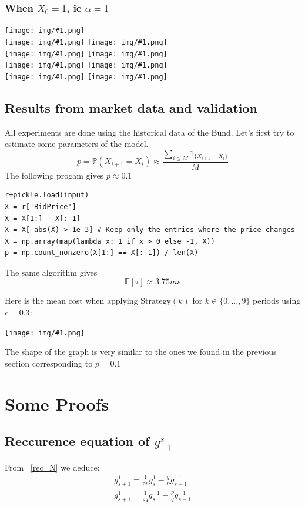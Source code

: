\documentclass{article}
\newcommand{\g}[2]{g_{#1}^{#2}}
\newcommand{\IMG}[1] { \texttt{[image: img/\#1.png]} }
\begin{document}
\newpage

\subsubsection*{When $X_0 = 1$, ie $\alpha=1$}

\IMG{11} \\
\IMG{12}
\IMG{13} \\
\IMG{14}
\IMG{15} \\
\IMG{16}
\IMG{17} \\
\IMG{18}
\IMG{19} \\

\newpage

\subsection{Results from market data and validation}
All experiments are done using the historical data of the Bund. Let's first try to estimate some parameters of the model.
$$ p = \mathbb{P}(X_{i+1} = X_i)  \approx \frac{ \sum_{i \leq M} 1_{ \{X_{i+1} = X_i \} } }{M} $$
The following progam gives $p \approx 0.1$

\begin{verbatim}
r=pickle.load(input)
X = r['BidPrice']
X = X[1:] - X[:-1]
X = X[ abs(X) > 1e-3] # Keep only the entries where the price changes
X = np.array(map(lambda x: 1 if x > 0 else -1, X))
p = np.count_nonzero(X[1:] == X[:-1]) / len(X)
\end{verbatim}

The same algorithm gives $$\mathbb{E}[ \tau ] \approx 3.75 ms$$

Here is the mean cost when applying $\text{Strategy}(k)$ for $k \in \{0, ... ,9 \}$ periods using $c=0.3$:

\IMG{esp_market}

The shape of the graph is very similar to the ones we found in the previous section corresponding to $p = 0.1$

\newpage

\appendix


\section{ Some Proofs }

\subsection{ Reccurence equation of $\g{-1}{s}$ }
From ~\ref{rec_N}  we deduce:
\begin{align*}
		\g{s+1}{1} = \frac{1}{z p} \g{s}{1} - \frac{q}{p} \g{s-1}{-1} \\
		\g{s+1}{1} = \frac{1}{ zq} \g{s}{-1} - \frac{p}{q} \g{s-1}{-1}
\end{align*}
\end{document}
